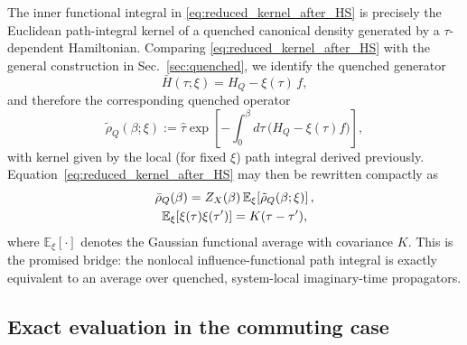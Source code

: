 The inner functional integral in \eqref{eq:reduced_kernel_after_HS} is precisely
the Euclidean path-integral kernel of a quenched canonical density generated by
a $\tau$-dependent Hamiltonian. Comparing \eqref{eq:reduced_kernel_after_HS} with
the general construction in Sec.~\ref{sec:quenched}, we identify the quenched
generator
\begin{equation}
    \bar H(\tau;\xi)=H_Q-\xi(\tau)\,f,
    \label{eq:quenched_generator_identification}
\end{equation}
and therefore the corresponding quenched operator
\begin{equation}
    \tilde\rho_Q(\beta;\xi)
    :=
    \hat\tau\exp\!\left[-\int_0^\beta d\tau\,\big(H_Q-\xi(\tau)f\big)\right],
    \label{eq:tilde_rho_def_again}
\end{equation}
with kernel given by the local (for fixed $\xi$) path integral derived previously.
Equation~\eqref{eq:reduced_kernel_after_HS} may then be rewritten compactly as
\begin{gather}
    \bar\rho_Q(\beta)
    =
    Z_X(\beta)\,\mathbb E_\xi\!\left[\tilde\rho_Q(\beta;\xi)\right],
    \label{eq:bar_rho_as_quenched_average_final}
    \\
    \mathbb E_\xi[\xi(\tau)\xi(\tau')]=K(\tau-\tau'), \notag
\end{gather}
where $\mathbb E_\xi[\cdot]$ denotes the Gaussian functional average with
covariance $K$. This is the promised bridge: the nonlocal influence-functional
path integral is exactly equivalent to an average over quenched, system-local
imaginary-time propagators.

\subsection{Exact evaluation in the commuting case}

